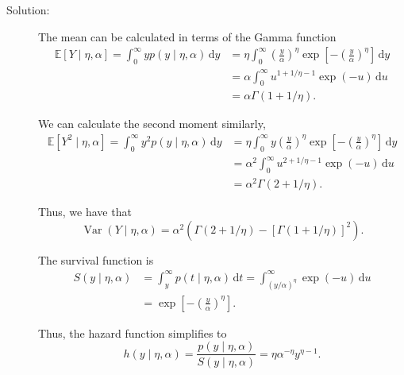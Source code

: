 \documentclass[letterpaper,11pt]{article}
\begin{document}
\begin{enumerate}
\begin{enumerate}
  \begin{description}
  \item[Solution:] The mean can be calculated in terms of the Gamma function
    \begin{align}
      \mathbb{E}\left[
      Y \mid \eta,\alpha
      \right] = \int_0^\infty y p\left(y \mid \eta,\alpha\right)\,\mathrm{d}y
      &= \eta\int_0^\infty \left(\frac{y}{\alpha}\right)^{\eta}
        \exp\left[
        -\left(\frac{y}{\alpha}\right)^\eta
        \right]\,\mathrm{d}y\nonumber\\
      &= \alpha\int_0^\infty u^{1 + 1/\eta - 1}\exp\left(-u\right)\,\mathrm{d}u \nonumber\\
      &= \alpha\Gamma\left(1 + 1/\eta\right).
        \label{eqn:p2_weibull_mean}
    \end{align}

    We can calculate the second moment similarly,
    \begin{align}
      \mathbb{E}\left[
      Y^2 \mid \eta,\alpha
      \right] = \int_0^\infty y^2 p\left(y \mid \eta,\alpha\right)\,\mathrm{d}y
      &= \eta\int_0^\infty y\left(\frac{y}{\alpha}\right)^{\eta}
        \exp\left[
        -\left(\frac{y}{\alpha}\right)^\eta
        \right]\,\mathrm{d}y\nonumber\\
      &= \alpha^2\int_0^\infty u^{2 + 1/\eta - 1}\exp\left(-u\right)\,\mathrm{d}u \nonumber\\
      &= \alpha^2\Gamma\left(2 + 1/\eta\right).
    \end{align}

    Thus, we have that
    \begin{equation}
      \operatorname{Var}\left(
        Y \mid \eta,\alpha
      \right) = \alpha^2\left(
        \Gamma\left(2 + 1/\eta\right) - \left[\Gamma\left(1 + 1/\eta\right)\right]^2
      \right).
    \end{equation}

    The survival function is
    \begin{align}
      S\left(y \mid \eta,\alpha\right)
      &= \int_y^\infty p\left(t \mid \eta,\alpha\right)\,\mathrm{d}t =
        \int_{\left(y/\alpha\right)^\eta}^\infty\exp\left(-u\right)\,\mathrm{d}u \nonumber\\
      &= \exp\left[-\left(\frac{y}{\alpha}\right)^\eta\right].
        \label{eqn:p2_weibull_survival}
    \end{align}

    Thus, the hazard function simplifies to
    \begin{equation}
      h\left(y \mid \eta,\alpha\right) =
      \frac{p\left(y \mid \eta,\alpha\right)}{S\left(y \mid \eta,\alpha\right)} = 
      \eta\alpha^{-\eta}y^{\eta-1}.
      \label{eqn:p2_weibull_hazard}
    \end{equation}


\end{description}
\end{enumerate}
\end{enumerate}
\end{document}
